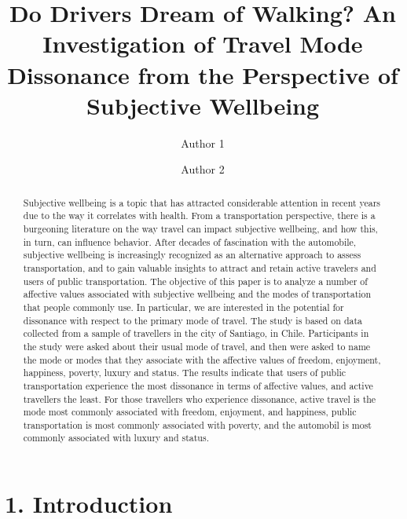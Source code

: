 \documentclass[]{elsarticle} %
\begin{document}
\begin{frontmatter}

  \title{Do Drivers Dream of Walking? An Investigation of Travel Mode Dissonance
from the Perspective of Subjective Wellbeing}
    \author[Some University]{Author 1}
    \author[Some School]{Author 2}
  
      \address[Some University]{Department, Street, City, State, Zip}
    \address[Some School]{Department, Street, City, State, Zip}
  
  \begin{abstract}
  Subjective wellbeing is a topic that has attracted considerable
  attention in recent years due to the way it correlates with health. From
  a transportation perspective, there is a burgeoning literature on the
  way travel can impact subjective wellbeing, and how this, in turn, can
  influence behavior. After decades of fascination with the automobile,
  subjective wellbeing is increasingly recognized as an alternative
  approach to assess transportation, and to gain valuable insights to
  attract and retain active travelers and users of public transportation.
  The objective of this paper is to analyze a number of affective values
  associated with subjective wellbeing and the modes of transportation
  that people commonly use. In particular, we are interested in the
  potential for dissonance with respect to the primary mode of travel. The
  study is based on data collected from a sample of travellers in the city
  of Santiago, in Chile. Participants in the study were asked about their
  usual mode of travel, and then were asked to name the mode or modes that
  they associate with the affective values of freedom, enjoyment,
  happiness, poverty, luxury and status. The results indicate that users
  of public transportation experience the most dissonance in terms of
  affective values, and active travellers the least. For those travellers
  who experience dissonance, active travel is the mode most commonly
  associated with freedom, enjoyment, and happiness, public transportation
  is most commonly associated with poverty, and the automobil is most
  commonly associated with luxury and status.
  \end{abstract}
  
 \end{frontmatter}

\hypertarget{introduction}{%
\section{1. Introduction}\label{introduction}}
\end{document}
